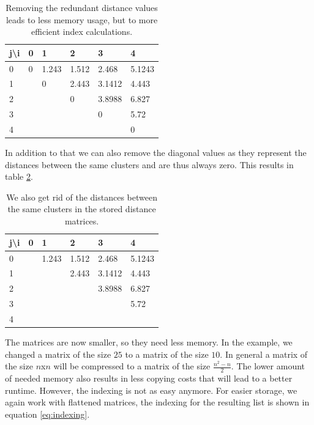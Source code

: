 \begin{table}[h]
    \centering
    \begin{tabular}{|l | l l l l l|}
    \hline
    j\textbackslash i & 0 & 1 & 2 & 3 & 4\\ \hline
    0 & 0 & 1.243 & 1.512 & 2.468 & 5.1243\\
    1 & \cellcolor{gray!25} & 0 & 2.443 & 3.1412 & 4.443\\
    2 & \cellcolor{gray!25} & \cellcolor{gray!25} & 0 & 3.8988 & 6.827\\
    3 & \cellcolor{gray!25} & \cellcolor{gray!25} & \cellcolor{gray!25} & 0 & 5.72\\
    4 & \cellcolor{gray!25} & \cellcolor{gray!25} & \cellcolor{gray!25} & \cellcolor{gray!25} & 0\\ \hline
    \end{tabular}
    \caption{Removing the redundant distance values leads to less memory usage, but to more efficient index calculations.}
    \label{dp:distances2}
\end{table}

In addition to that we can also remove the diagonal values as they represent the distances between the same clusters and are thus always zero. This results in table \ref{dp:distances3}.

\begin{table}[H]
    \centering
    \begin{tabular}{|l | l l l l l|}
    \hline
    j\textbackslash i & 0 & 1 & 2 & 3 & 4\\ \hline
    0 & \cellcolor{gray!25} & 1.243 & 1.512 & 2.468 & 5.1243\\
    1 & \cellcolor{gray!25} & \cellcolor{gray!25} & 2.443 & 3.1412 & 4.443\\
    2 & \cellcolor{gray!25} & \cellcolor{gray!25} & \cellcolor{gray!25} & 3.8988 & 6.827\\
    3 & \cellcolor{gray!25} & \cellcolor{gray!25} & \cellcolor{gray!25} & \cellcolor{gray!25} & 5.72\\
    4 & \cellcolor{gray!25} & \cellcolor{gray!25} & \cellcolor{gray!25} & \cellcolor{gray!25} & \cellcolor{gray!25} \\ \hline
    \end{tabular}
    \caption{We also get rid of the distances between the same clusters in the stored distance matrices.}
    \label{dp:distances3}
\end{table}

The matrices are now smaller, so they need less memory. In the example, we changed a matrix of the size $25$ to a matrix of the size $10$. In general a matrix of the size $n$x$n$ will be compressed to a matrix of the size $\frac{n^2-n}{2}$. The lower amount of needed memory also results in less copying costs that will lead to a better runtime. However, the indexing is not as easy anymore. For easier storage, we again work with flattened matrices, the indexing for the resulting list is shown in equation \ref{eq:indexing}.

